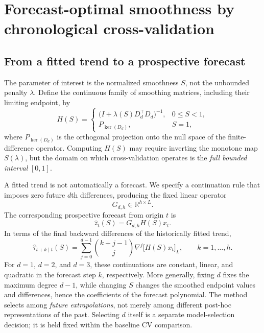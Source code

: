 \section{Forecast-optimal smoothness by chronological cross-validation}
\label{sec:forecast_cv}

\subsection{From a fitted trend to a prospective forecast}

The parameter of interest is the normalized smoothness $S$, not the
unbounded penalty $\lambda$. Define the continuous family of
smoothing matrices, including their limiting endpoint, by
\begin{equation}
\label{eq:sindexed_smoothing_matrix}
H(S)=
\begin{cases}
\bigl(I+\lambda(S)D_d^\top D_d\bigr)^{-1},&0\le S<1,\\
P_{\ker(D_d)},&S=1,
\end{cases}
\end{equation}
where $P_{\ker(D_d)}$ is the orthogonal projection onto the
null space of the finite-difference operator. Computing
$H(S)$ may require inverting the monotone map $S(\lambda)$,
but the domain on which cross-validation operates is the
\emph{full bounded interval} $[0,1]$.

A fitted trend is not automatically a forecast. We specify
a continuation rule that imposes zero future $d$th
differences, producing the fixed linear operator
\begin{equation}
\label{eq:continuation_operator_space}
G_{d,h}\in\mathbb{R}^{h\times L}.
\end{equation}
The corresponding prospective forecast from origin $t$ is
\begin{equation}
\label{eq:forecast_operator}
\widehat z_t(S)=G_{d,h}H(S)x_t.
\end{equation}
In terms of the final backward differences of the
historically fitted trend,
\begin{equation}
\label{eq:continuation}
\widehat\tau_{t+k\mid t}(S)
=\sum_{j=0}^{d-1}\binom{k+j-1}{j}
\nabla^j\bigl[H(S)x_t\bigr]_{L},
\qquad k=1,\ldots,h.
\end{equation}
For $d=1$, $d=2$, and $d=3$, these continuations are constant,
linear, and quadratic in the forecast step $k$, respectively.
More generally, fixing $d$ fixes the maximum degree $d-1$,
while changing $S$ changes the smoothed endpoint values and
differences, hence the coefficients of the forecast polynomial.
The method selects among \emph{future extrapolations}, not
merely among different post-hoc representations of the past.
Selecting $d$ itself is a separate model-selection decision;
it is held fixed within the baseline CV comparison.

